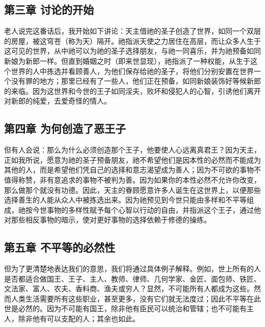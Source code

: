 
\subsection{第三章 讨论的开始}

老人说完这番话后，我开始如下讲论：天主借祂的圣子创造了世界，如同一个双层的房屋，被这穹苍（称为天）隔开。祂指派天使之力居住在高层，而让众多人生于这可见的世界，从中祂可以为祂的圣子选择朋友，与祂一同喜乐，并为祂预备如同新娘为新郎一样。但直到婚姻之时（即来世显现），祂指派了一种权能，从生于这个世界的人中拣选并看顾善人，为他们保存给祂的圣子，将他们分别安置在世界一个没有罪的地方；那里已经有了一些人，他们正在预备，如同新娘装饰好等候新郎的来临。因为这世界和今世的王子如同淫夫，败坏和侵犯人的心智，引诱他们离开对新郎的纯爱，去爱奇怪的情人。\par


\subsection{第四章 为何创造了恶王子}

但有人会说：那么为什么必须创造那个王子，他要使人心远离真君王？因为天主，正如我所说，愿意为祂的圣子预备朋友，祂不希望他们是因本性的必然而不能成为其他的人，而是希望他们凭自己的选择和意志渴望成为善人；因为不可欲的事物不值得称赞，非有意追求的事物不被判为善。因为如果你的本性必然不允许你改变，那么做那个就没有功德。因此，天主的眷顾愿意许多人诞生在这世界上，以便那些选择善生的人能从众人中被拣选出来。因为祂预见到今世只能由多样和不平等组成，祂按今世事物的多样性赋予每个心智以行动的自由，并指派这个王子，通过他对那些相反事物的暗示，使对更好事物的选择依赖于修德的操练。\par


\subsection{第五章 不平等的必然性}

但为了更清楚地表达我们的意思，我们将通过具体例子解释。例如，世上所有的人是否都适合做国王、王子、主人、教师、律师、几何学家、金匠、面包师、铁匠、文法家、富人、农夫、香料商、渔夫或穷人？显然，不可能所有人都成为这些。然而人类生活需要所有这些职业，甚至更多，没有它们就无法度过；因此不平等在此世是必然的。因为不可能有国王，除非他有臣民可以统治和管辖；也不可能有主人，除非他有可以支配的人；其余也如此。\par

